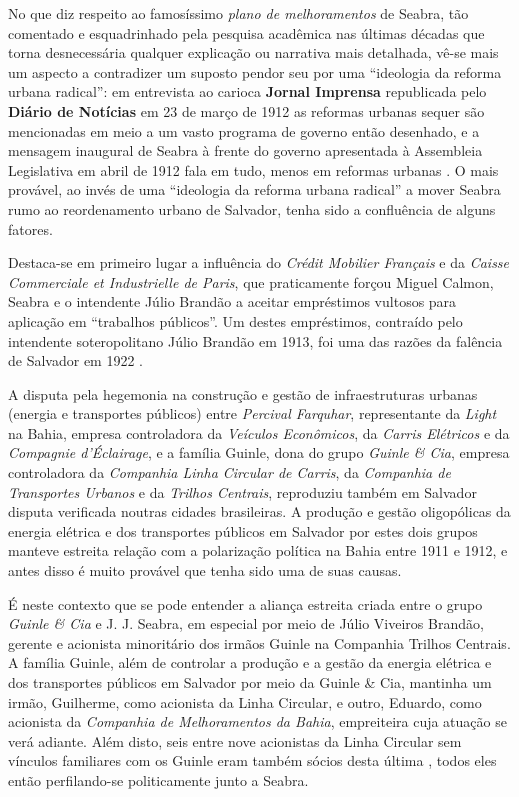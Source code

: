 No que diz respeito ao famosíssimo \textit{plano de melhoramentos} de Seabra, tão comentado e esquadrinhado pela pesquisa acadêmica nas últimas décadas que torna desnecessária qualquer explicação ou narrativa mais detalhada, vê-se mais um aspecto a contradizer um suposto pendor seu por uma ``ideologia da reforma urbana radical'': em entrevista ao carioca \textbf{Jornal Imprensa} republicada pelo \textbf{Diário de Notícias} em 23 de março de 1912 as reformas urbanas sequer são mencionadas em meio a um vasto programa de governo então desenhado, e a mensagem inaugural de Seabra à frente do governo apresentada à Assembleia Legislativa em abril de 1912 fala em tudo, menos em reformas urbanas \cite[pp.~92-94]{CUNHA2011}. O mais provável, ao invés de uma ``ideologia da reforma urbana radical'' a mover Seabra rumo ao reordenamento urbano de Salvador, tenha sido a confluência de alguns fatores.

Destaca-se em primeiro lugar a influência do \textit{Crédit Mobilier Français} e da \textit{Caisse Commerciale et Industrielle de Paris}, que praticamente forçou Miguel Calmon, Seabra e o intendente Júlio Brandão a aceitar empréstimos vultosos para aplicação em ``trabalhos públicos''. Um destes empréstimos, contraído pelo intendente soteropolitano Júlio Brandão em 1913, foi uma das razões da falência de Salvador em 1922 \cite[pp.~119-122,~291]{CUNHA2011}. 

A disputa pela hegemonia na construção e gestão de infraestruturas urbanas (energia e transportes públicos) entre \textit{Percival Farquhar}, representante da \textit{Light} na Bahia, empresa controladora da \textit{Veículos Econômicos}, da \textit{Carris Elétricos} e da \textit{Compagnie d'Éclairage}, e a família Guinle, dona do grupo \textit{Guinle \& Cia}, empresa controladora da \textit{Companhia Linha Circular de Carris}, da \textit{Companhia de Transportes Urbanos} e da \textit{Trilhos Centrais}, reproduziu também em Salvador disputa verificada noutras cidades brasileiras. A produção e gestão oligopólicas da energia elétrica e dos transportes públicos em Salvador por estes dois grupos manteve estreita relação com a polarização política na Bahia entre 1911 e 1912, e antes disso é muito provável que tenha sido uma de suas causas.

É neste contexto que se pode entender a aliança estreita criada entre o grupo \textit{Guinle \& Cia} e J. J. Seabra, em especial por meio de Júlio Viveiros Brandão, gerente e acionista minoritário dos irmãos Guinle na Companhia Trilhos Centrais. A família Guinle, além de controlar a produção e a gestão da energia elétrica e dos transportes públicos em Salvador por meio da Guinle \& Cia, mantinha um irmão, Guilherme, como acionista da Linha Circular, e outro, Eduardo, como acionista da \textit{Companhia de Melhoramentos da Bahia}, empreiteira cuja atuação se verá adiante. Além disto, seis entre nove acionistas da Linha Circular sem vínculos familiares com os Guinle eram também sócios desta última \cite[pp.~122]{CUNHA2011}, todos eles então perfilando-se politicamente junto a Seabra.

